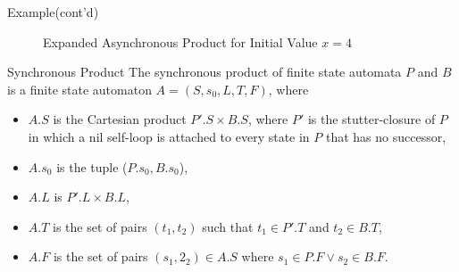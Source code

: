\documentclass[12pt]{beamer}
\begin{document}
\begin{frame}{Example(cont'd)}
	\begin{figure}[ht] %
	\centering %
	\begin{adjustbox}{max width=\textwidth, max totalheight=\textheight}
		\end{adjustbox}
		\caption{Expanded Asynchronous Product for Initial Value $x=4$}
		
	\end{figure}
\end{frame}

\begin{frame}{Synchronous Product}
	The synchronous product of finite state automata $P$ and $B$ is a finite state automaton $A = (S, s_{0}, L, T, F)$, where 
\begin{itemize}
	\item $A.S$ is the Cartesian product $P'.S \times B.S$, where $P'$ is the stutter-closure of $P$ in which a nil self-loop is attached to every state in $P$ that has no successor,
	\item $A.s_{0}$ is the tuple ($P.s_{0}, B.s_{0}$),
	\item $A.L$ is $P'.L \times B.L$,
	\item $A.T$ is the set of pairs $(t_{1}, t_{2})$ such that $t_{1}\in P'.T$ and $t_{2} \in B.T$, 
	\item $A.F$ is the set of pairs $(s_{1}, 2_{2})\in A.S$ where $s_{1}\in P.F \lor s_{2} \in B.F$.
\end{itemize}
\end{frame}
\end{document}
